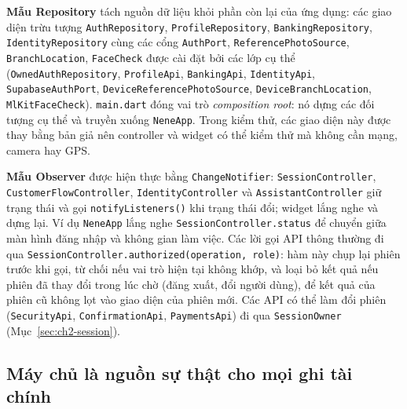 \textbf{Mẫu Repository} \parencite{ch2-fowler-peaa} tách nguồn dữ liệu khỏi phần còn lại của ứng dụng: các giao diện trừu tượng \texttt{Auth\allowbreak{}Repository}, \texttt{Profile\allowbreak{}Repository}, \texttt{Banking\allowbreak{}Repository}, \texttt{Identity\allowbreak{}Repository} cùng các cổng \texttt{AuthPort}, \texttt{Reference\allowbreak{}Photo\allowbreak{}Source}, \texttt{Branch\allowbreak{}Location}, \texttt{FaceCheck} được cài đặt bởi các lớp cụ thể (\texttt{Owned\allowbreak{}Auth\allowbreak{}Repository}, \texttt{ProfileApi}, \texttt{BankingApi}, \texttt{IdentityApi}, \texttt{Supabase\allowbreak{}Auth\allowbreak{}Port}, \texttt{Device\allowbreak{}Reference\allowbreak{}Photo\allowbreak{}Source}, \texttt{Device\allowbreak{}Branch\allowbreak{}Location}, \texttt{Ml\allowbreak{}Kit\allowbreak{}Face\allowbreak{}Check}). \texttt{main.\allowbreak{}dart} đóng vai trò \emph{composition root}: nó dựng các đối tượng cụ thể và truyền xuống \texttt{NeneApp}. Trong kiểm thử, các giao diện này được thay bằng bản giả nên controller và widget có thể kiểm thử mà không cần mạng, camera hay GPS.

\textbf{Mẫu Observer} \parencite{ch2-gof} được hiện thực bằng \texttt{Change\allowbreak{}Notifier}: \texttt{Session\allowbreak{}Controller}, \texttt{Customer\allowbreak{}Flow\allowbreak{}Controller}, \texttt{Identity\allowbreak{}Controller} và \texttt{Assistant\allowbreak{}Controller} giữ trạng thái và gọi \texttt{notify\allowbreak{}Listeners()} khi trạng thái đổi; widget lắng nghe và dựng lại. Ví dụ \texttt{NeneApp} lắng nghe \texttt{Session\allowbreak{}Controller.\allowbreak{}status} để chuyển giữa màn hình đăng nhập và không gian làm việc. Các lời gọi API thông thường đi qua \texttt{Session\allowbreak{}Controller.\allowbreak{}authorized(operation, role)}: hàm này chụp lại phiên trước khi gọi, từ chối nếu vai trò hiện tại không khớp, và loại bỏ kết quả nếu phiên đã thay đổi trong lúc chờ (đăng xuất, đổi người dùng), để kết quả của phiên cũ không lọt vào giao diện của phiên mới. Các API có thể làm đổi phiên (\texttt{SecurityApi}, \texttt{Confirmation\allowbreak{}Api}, \texttt{PaymentsApi}) đi qua \texttt{SessionOwner} (Mục~\ref{sec:ch2-session}).

\subsection{Máy chủ là nguồn sự thật cho mọi ghi tài chính}
\label{sec:ch2-authoritative}

